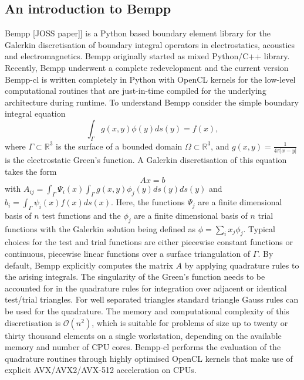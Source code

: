 \subsection{An introduction to Bempp}
Bempp [JOSS paper]] is a Python based boundary element library for the Galerkin discretisation of boundary integral operators in electrostatics, acoustics and electromagnetics. Bempp originally started as mixed Python/C++ library. Recently, Bempp underwent a complete redevelopment and the current version Bempp-cl is written completely in Python with OpenCL kernels for the low-level computational routines that are just-in-time compiled for the underlying architecture during runtime. To understand Bempp consider the simple boundary integral equation
$$
\int_{\Gamma}g(x, y) \phi(y)ds(y) = f(x),
$$
where $\Gamma\subset\mathbb{R}^3$ is the surface of a bounded domain $\Omega\subset\mathbb{R}^3$, and $g(x, y) = \frac{1}{4\pi|x -y|}$ is the electrostatic Green's function. A Galerkin discretisation of this equation takes the form
$$
Ax = b
$$
with $A_{ij} = \int_{\Gamma}\Psi_i(x)\int_{\Gamma}g(x, y)\phi_j(y)ds(y)ds(y)$ and $b_i = \int_{\Gamma}\psi_i(x)f(x)ds(x)$. Here, the functions $\Psi_j$ are a finite dimensional basis of $n$ test functions and the $\phi_j$ are a finite dimensional basis of $n$ trial functions with the Galerkin solution being defined as $\phi=\sum_{i}x_j\phi_j$. Typical choices for the test and trial functions are either piecewise constant functions or continuous, piecewise linear functions over a surface triangulation of $\Gamma$. By default, Bempp explicitly computes the matrix $A$ by applying quadrature rules to the arising integrals. The singularity of the Green's function needs to be accounted for in the quadrature rules for integration over adjacent or identical test/trial triangles. For well separated triangles standard triangle Gauss rules can be used for the quadrature. The memory and computational complexity of this discretisation is $\mathcal{O}(n^2)$, which is suitable for problems of size up to twenty or thirty thousand elements on a single workstation, depending on the available memory and number of CPU cores. Bempp-cl performs the evaluation of the quadrature routines through highly optimised OpenCL kernels that make use of explicit AVX/AVX2/AVX-512 acceleration on CPUs.


